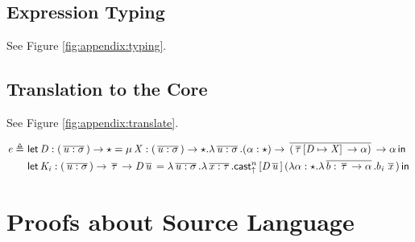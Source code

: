 \subsection{Expression Typing}
See Figure \ref{fig:appendix:typing}.
\begin{figure*}
\ottdefnctxsrc{}
\ottdefnpgmsrc{}
\ottdefndeclsrc{}
\ottdefnpatsrc{}
\ottdefnexprsrc{}
\caption{Typing rules of source language}
\label{fig:appendix:typing}
\end{figure*}

\subsection{Translation to the Core}
See Figure \ref{fig:appendix:translate}.
\begin{figure*}
\ottdefnctxtrans{}
\ottdefnpgmtrans{}
\ottdefndecltrans{}
\begin{align*}
\mathit{e}  \triangleq ~  &  \mathsf{let} \, \mathit{D}  :  (  \,\overline{  \mathit{u}  :  \sigma  }\,  )  \rightarrow  \star  =  \mu \, \mathit{X}  :  (  \,\overline{  \mathit{u}  :  \sigma  }\,  )  \rightarrow  \star  .  \lambda  \,\overline{  \mathit{u}  :  \sigma  }\,  .  (  \alpha  :  \star  )  \rightarrow  \,\overline{  (  \,\overline{  \tau  }\,  [  \mathit{D}  \mapsto  \mathit{X}  ] \,  \rightarrow  \alpha  )  }\,  \rightarrow  \alpha \, \mathsf{in} \, \\ &  \mathsf{let} \, \mathit{K_{\mathit{i}}}  :  (  \,\overline{  \mathit{u}  :  \sigma  }\,  )  \rightarrow  \,\overline{  \tau  }\,  \rightarrow  \mathit{D}    \,\overline{  \mathit{u}  }\,  =  \lambda  \,\overline{  \mathit{u}  :  \sigma  }\,  .  \lambda  \,\overline{  \mathit{x}  :  \tau  }\,  .  \mathsf{cast}_{\uparrow}^n \, [  \mathit{D}    \,\overline{  \mathit{u}  }\,  ] \,  (  \lambda  \alpha  :  \star  .  \lambda  \,\overline{  b  :  \,\overline{  \tau  }\,  \rightarrow  \alpha  }\,  .  b_{\mathit{i}} \, \,\overline{  \mathit{x}  }\,  ) \, \mathsf{in} \, 
\end{align*}
\ottdefnpattrans{}
\ottdefnexprtrans{}
\caption{Translation rules of source language}
\label{fig:appendix:translate}
\end{figure*}


\section{Proofs about Source Language}
